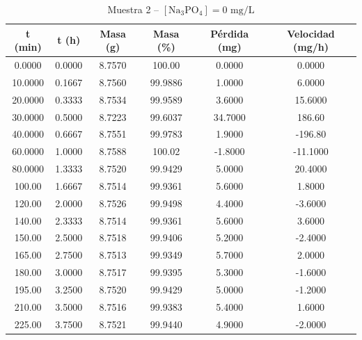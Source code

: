 \documentclass[11pt,a4paper]{article}
\begin{document}
\begin{table}[H]
\centering
\caption{Muestra 2 -- $[\text{Na}_3\text{PO}_4] = 0\text{ mg/L}$}
\label{tab:3_4_c0_m2}
\begin{tabular}{cccccc}
\toprule
t (min) & t (h) & Masa (g) & Masa (\%) & Pérdida (mg) & Velocidad (mg/h) \\
\midrule
0.0000 & 0.0000 & 8.7570 & 100.00 & 0.0000 & 0.0000 \\
10.0000 & 0.1667 & 8.7560 & 99.9886 & 1.0000 & 6.0000 \\
20.0000 & 0.3333 & 8.7534 & 99.9589 & 3.6000 & 15.6000 \\
30.0000 & 0.5000 & 8.7223 & 99.6037 & 34.7000 & 186.60 \\
40.0000 & 0.6667 & 8.7551 & 99.9783 & 1.9000 & -196.80 \\
60.0000 & 1.0000 & 8.7588 & 100.02 & -1.8000 & -11.1000 \\
80.0000 & 1.3333 & 8.7520 & 99.9429 & 5.0000 & 20.4000 \\
100.00 & 1.6667 & 8.7514 & 99.9361 & 5.6000 & 1.8000 \\
120.00 & 2.0000 & 8.7526 & 99.9498 & 4.4000 & -3.6000 \\
140.00 & 2.3333 & 8.7514 & 99.9361 & 5.6000 & 3.6000 \\
150.00 & 2.5000 & 8.7518 & 99.9406 & 5.2000 & -2.4000 \\
165.00 & 2.7500 & 8.7513 & 99.9349 & 5.7000 & 2.0000 \\
180.00 & 3.0000 & 8.7517 & 99.9395 & 5.3000 & -1.6000 \\
195.00 & 3.2500 & 8.7520 & 99.9429 & 5.0000 & -1.2000 \\
210.00 & 3.5000 & 8.7516 & 99.9383 & 5.4000 & 1.6000 \\
225.00 & 3.7500 & 8.7521 & 99.9440 & 4.9000 & -2.0000 \\
\bottomrule
\end{tabular}
\end{table}
\end{document}
